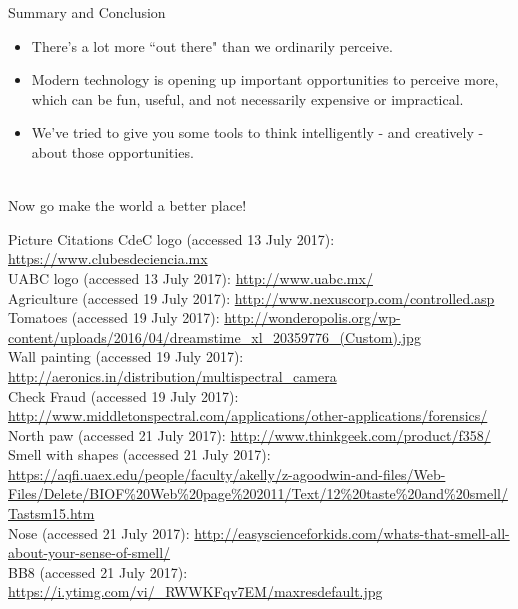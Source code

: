 \documentclass{beamer}
\begin{document}
\begin{frame}{Summary and Conclusion}
   \begin{itemize}
      \item There's a lot more ``out there" than we ordinarily perceive.
      \item Modern technology is opening up important opportunities to perceive more, which can be fun, useful, and not necessarily expensive or impractical.
      \item We've tried to give you some tools to think intelligently - and creatively - about those opportunities.
      ~\\~\\
   \end{itemize}
   \begin{center}
      {\Huge Now go make the world a better place!}
   \end{center}
\end{frame}

\begin{frame}{Picture Citations} 
\fontsize{5}{4}\selectfont  
CdeC logo (accessed 13 July 2017): \href{https://www.clubesdeciencia.mx}{https://www.clubesdeciencia.mx}\\
UABC logo (accessed 13 July 2017): \href{http://www.uabc.mx/}{http://www.uabc.mx/}\\
Agriculture (accessed 19 July 2017): \href{http://www.nexuscorp.com/controlled.asp}{http://www.nexuscorp.com/controlled.asp}\\
Tomatoes (accessed 19 July 2017): \href{http://wonderopolis.org/wp-content/uploads/2016/04/dreamstime\_xl\_20359776\_(Custom).jpg}{http://wonderopolis.org/wp-content/uploads/2016/04/dreamstime\_xl\_20359776\_(Custom).jpg}\\
Wall painting (accessed 19 July 2017): \href{http://aeronics.in/distribution/multispectral\_camera}{http://aeronics.in/distribution/multispectral\_camera}\\
Check Fraud (accessed 19 July 2017): \href{http://www.middletonspectral.com/applications/other-applications/forensics/}{http://www.middletonspectral.com/applications/other-applications/forensics/}\\
North paw (accessed 21 July 2017): \href{http://www.thinkgeek.com/product/f358/}{http://www.thinkgeek.com/product/f358/}\\
Smell with shapes (accessed 21 July 2017): \href{https://aqfi.uaex.edu/people/faculty/akelly/z-agoodwin-and-files/Web-Files/Delete/BIOF\%20Web\%20page\%202011/Text/12\%20taste\%20and\%20smell/Tastsm15.htm}{https://aqfi.uaex.edu/people/faculty/akelly/z-agoodwin-and-files/Web-Files/Delete/BIOF\%20Web\%20page\%202011/Text/12\%20taste\%20and\%20smell/Tastsm15.htm}\\
Nose (accessed 21 July 2017): \href{http://easyscienceforkids.com/whats-that-smell-all-about-your-sense-of-smell/}{http://easyscienceforkids.com/whats-that-smell-all-about-your-sense-of-smell/}\\
BB8 (accessed 21 July 2017): \href{https://i.ytimg.com/vi/\_RWWKFqv7EM/maxresdefault.jpg}{https://i.ytimg.com/vi/\_RWWKFqv7EM/maxresdefault.jpg}\\
\end{frame}
\end{document}
